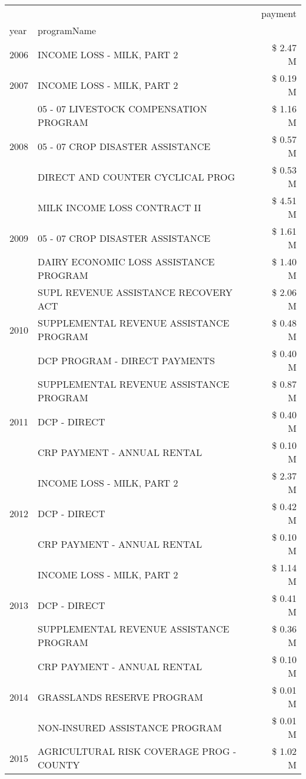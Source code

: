 \begin{tabular}{llr}
\toprule
 &  & payment \\
year & programName &  \\
\midrule
2006 & INCOME LOSS - MILK, PART 2 & \$ 2.47 M \\
\cline{1-3}
2007 & INCOME LOSS - MILK, PART 2 & \$ 0.19 M \\
\cline{1-3}
\multirow[t]{3}{*}{2008} & 05 - 07 LIVESTOCK COMPENSATION PROGRAM & \$ 1.16 M \\
 & 05 - 07 CROP DISASTER ASSISTANCE & \$ 0.57 M \\
 & DIRECT AND COUNTER CYCLICAL PROG & \$ 0.53 M \\
\cline{1-3}
\multirow[t]{3}{*}{2009} & MILK INCOME LOSS CONTRACT II & \$ 4.51 M \\
 & 05 - 07 CROP DISASTER ASSISTANCE & \$ 1.61 M \\
 & DAIRY ECONOMIC LOSS ASSISTANCE PROGRAM & \$ 1.40 M \\
\cline{1-3}
\multirow[t]{3}{*}{2010} & SUPL REVENUE ASSISTANCE RECOVERY ACT & \$ 2.06 M \\
 & SUPPLEMENTAL REVENUE ASSISTANCE PROGRAM & \$ 0.48 M \\
 & DCP PROGRAM - DIRECT PAYMENTS & \$ 0.40 M \\
\cline{1-3}
\multirow[t]{3}{*}{2011} & SUPPLEMENTAL REVENUE ASSISTANCE PROGRAM & \$ 0.87 M \\
 & DCP - DIRECT & \$ 0.40 M \\
 & CRP PAYMENT - ANNUAL RENTAL & \$ 0.10 M \\
\cline{1-3}
\multirow[t]{3}{*}{2012} & INCOME LOSS - MILK, PART 2 & \$ 2.37 M \\
 & DCP - DIRECT & \$ 0.42 M \\
 & CRP PAYMENT - ANNUAL RENTAL & \$ 0.10 M \\
\cline{1-3}
\multirow[t]{3}{*}{2013} & INCOME LOSS - MILK, PART 2 & \$ 1.14 M \\
 & DCP - DIRECT & \$ 0.41 M \\
 & SUPPLEMENTAL REVENUE ASSISTANCE PROGRAM & \$ 0.36 M \\
\cline{1-3}
\multirow[t]{3}{*}{2014} & CRP PAYMENT - ANNUAL RENTAL & \$ 0.10 M \\
 & GRASSLANDS RESERVE PROGRAM & \$ 0.01 M \\
 & NON-INSURED ASSISTANCE PROGRAM & \$ 0.01 M \\
\cline{1-3}
\multirow[t]{3}{*}{2015} & AGRICULTURAL RISK COVERAGE PROG - COUNTY & \$ 1.02 M \\

\end{tabular}
